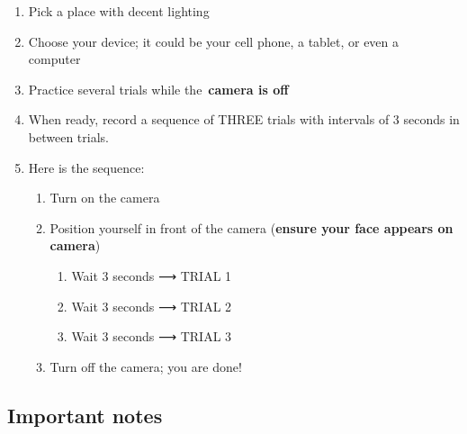 \documentclass[
  letterpaper,
  DIV=11,
  numbers=noendperiod]{scrartcl}
\providecommand{\tightlist}{%
  \setlength{\itemsep}{0pt}\setlength{\parskip}{0pt}}\usepackage{longtable,booktabs,array}
\begin{document}
\begin{enumerate}
\def\labelenumi{\arabic{enumi}.}
\tightlist
\item
  Pick a place with decent lighting
\item
  Choose your device; it could be your cell phone, a tablet, or even a
  computer~
\item
  Practice several trials while the~\textbf{camera is off}
\item
  When ready, record a sequence of THREE trials with intervals of 3
  seconds in between trials.
\item
  Here is the sequence:

  \begin{enumerate}
  \def\labelenumii{\arabic{enumii}.}
  \tightlist
  \item
    Turn on the camera
  \item
    Position yourself in front of the camera (\textbf{ensure your face
    appears on camera})

    \begin{enumerate}
    \def\labelenumiii{\arabic{enumiii}.}
    \tightlist
    \item
      Wait 3 seconds ⟶ TRIAL 1~
    \item
      Wait 3 seconds ⟶ TRIAL 2
    \item
      Wait 3 seconds ⟶ TRIAL 3
    \end{enumerate}
  \item
    Turn off the camera; you are done!
  \end{enumerate}
\end{enumerate}

\hypertarget{important-notes}{%
\subsection{Important notes}\label{important-notes}}
\end{document}
